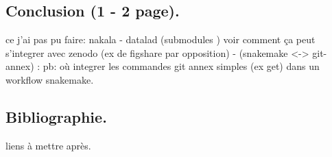 \documentclass[11pt]{article}
\begin{document}
\subsection{Conclusion (1 - 2 page).}
\label{sec:org3ea791c}
ce j'ai pas pu faire: nakala - datalad (submodules ) voir comment ça
peut s'integrer avec zenodo (ex de figshare par opposition) -
(snakemake <-> git-annex) : pb: où integrer les commandes git annex
simples (ex get) dans un workflow snakemake.

\subsection{Bibliographie.}
\label{sec:org6858bc7}
liens à mettre après.
\end{document}
